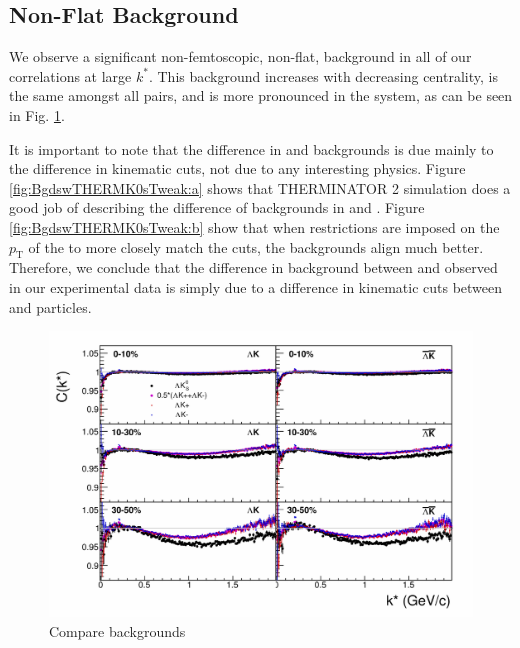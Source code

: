 \documentclass[../AnalysisNoteJBuxton.tex]{subfiles}
\begin{document}
\subsection{Non-Flat Background}
\label{NonFlatBackground}

We observe a significant non-femtoscopic, non-flat, background in all of our correlations at large $k^{*}$.  This background increases with decreasing centrality, is the same amongst all \LamKpm pairs, and is more pronounced in the \LamKs system, as can be seen in Fig. \ref{fig:CompareAllBgds}.  

It is important to note that the difference in \LamKpm and \LamKs backgrounds is due mainly to the difference in kinematic cuts, not due to any interesting physics.  Figure \ref{fig:BgdswTHERMK0sTweak:a} shows that THERMINATOR 2 simulation does a good job of describing the difference of backgrounds in \LamKpm and \LamKs. Figure \ref{fig:BgdswTHERMK0sTweak:b} show that when restrictions are imposed on the $p_{\textrm{T}}$ of the \Ks to more closely match the \Kpm cuts, the backgrounds align much better.  Therefore, we conclude that the difference in background between \LamKpm and \LamKs observed in our experimental data is simply due to a difference in kinematic cuts between \Kpm and \Ks particles.

\begin{figure}[h]
  \centering
  \includegraphics[width=\textwidth]{5_Fitting/Figures/CompareLamKchAvgToLamK0_wIndivKch_0010_1030_3050.pdf}
  \caption[Compare Backgrounds]{Compare backgrounds}
  \label{fig:CompareAllBgds}
\end{figure}
\end{document}
